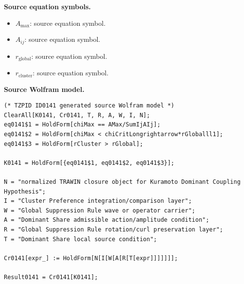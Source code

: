 \begin{minipage}[t]{0.49\linewidth}
\begingroup
\small
\raggedright
\textbf{Source equation symbols.}\par
\begin{itemize}[leftmargin=1.35em,itemsep=1pt,topsep=1pt,parsep=0pt]
    \item $A_{\max}$: source equation symbol.
    \item $A_{ij}$: source equation symbol.
    \item $r_{\mathrm{global}}$: source equation symbol.
    \item $r_{\mathrm{cluster}}$: source equation symbol.
\end{itemize}
\endgroup
\end{minipage}\hfill
\begin{minipage}[t]{0.47\linewidth}
\begingroup
\scriptsize
\raggedright
\textbf{Source Wolfram model.}\par
\begin{Verbatim}[fontsize=\tiny,breaklines=true,breakanywhere=true]
(* TZPID ID0141 generated source Wolfram model *)
ClearAll[K0141, Cr0141, T, R, A, W, I, N];
eq0141$1 = HoldForm[chiMax == AMax/SumIjAIj];
eq0141$2 = HoldForm[chiMax < chiCritLongrightarrow*rGloballl1];
eq0141$3 = HoldForm[rCluster > rGlobal];

K0141 = HoldForm[{eq0141$1, eq0141$2, eq0141$3}];

N = "normalized TRAWIN closure object for Kuramoto Dominant Coupling Hypothesis";
I = "Cluster Preference integration/comparison layer";
W = "Global Suppression Rule wave or operator carrier";
A = "Dominant Share admissible action/amplitude condition";
R = "Global Suppression Rule rotation/curl preservation layer";
T = "Dominant Share local source condition";

Cr0141[expr_] := HoldForm[N[I[W[A[R[T[expr]]]]]]];

Result0141 = Cr0141[K0141];
\end{Verbatim}
\endgroup
\end{minipage}

